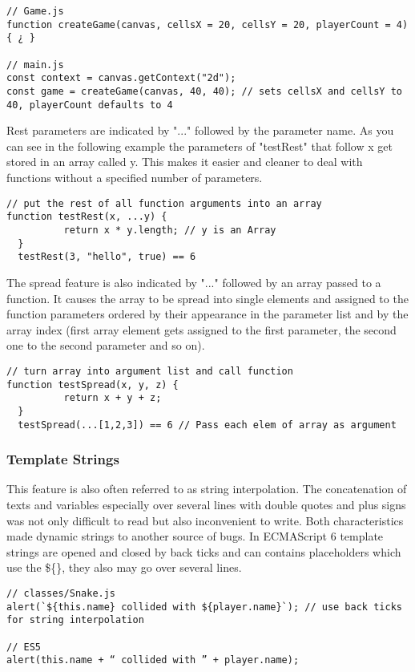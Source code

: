 \documentclass{bioinfo}
\begin{document}
\begin{lstlisting}[caption= My Javascript Example]
// Game.js
function createGame(canvas, cellsX = 20, cellsY = 20, playerCount = 4) { ¿ }

// main.js
const context = canvas.getContext("2d");
const game = createGame(canvas, 40, 40); // sets cellsX and cellsY to 40, playerCount defaults to 4
\end{lstlisting}

Rest parameters are indicated by  "..." followed by the parameter name. As you can see in the following 
example the parameters of "testRest" that follow x get stored in an array called y. This makes it easier
and cleaner to deal with functions without a specified number of parameters.

\begin{lstlisting}[caption= My Javascript Example]
// put the rest of all function arguments into an array
function testRest(x, ...y) {
          return x * y.length; // y is an Array
  }
  testRest(3, "hello", true) == 6
\end{lstlisting}

The spread feature is also indicated by "..." followed by an array passed to a function. It causes the array to be spread into single
elements and assigned to the function parameters ordered by their appearance in the parameter list and by the array index (first array element gets assigned to the first parameter, the second one to the second parameter and so on).
\begin{lstlisting}[caption= My Javascript Example]
// turn array into argument list and call function
function testSpread(x, y, z) {
          return x + y + z;
  }
  testSpread(...[1,2,3]) == 6 // Pass each elem of array as argument
\end{lstlisting}

\subsubsection{Template Strings}
This feature is also often referred to as string interpolation.
The concatenation of texts and variables especially over several lines with double quotes and plus signs was not only difficult to read but also inconvenient to write.  
Both characteristics made dynamic strings to another source of bugs. In ECMAScript 6 template strings are opened and closed by back ticks and can contains placeholders which use the
\$\{\}, they also may go over several lines.

\begin{lstlisting}[caption= My Javascript Example]
// classes/Snake.js
alert(`${this.name} collided with ${player.name}`); // use back ticks for string interpolation

// ES5
alert(this.name + “ collided with ” + player.name);
\end{lstlisting}
\end{document}
